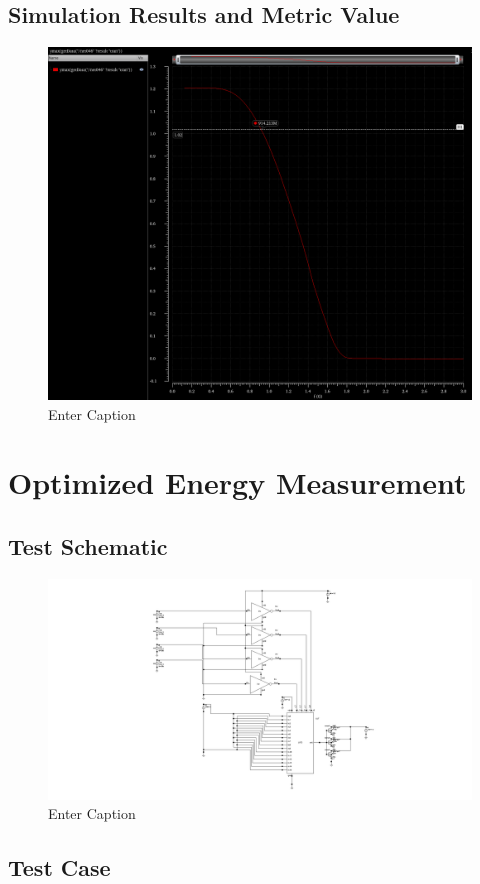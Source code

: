 \documentclass[12pt]{article}
\begin{document}
\newpage

\subsection{Simulation Results and Metric Value}

\begin{figure}[H]
    \centering
    \includegraphics[width=0.5\linewidth]{writeup//figures/max_frequencies_optimized.png}
    \caption{Enter Caption}
\end{figure}



\newpage

\section{Optimized Energy Measurement}
\subsection{Test Schematic}

\begin{figure}[H]
    \centering
    \includegraphics[width=0.5\linewidth]{writeup//figures/updated_energy_opt_testchem.png}
    \caption{Enter Caption}
\end{figure}


\newpage

\subsection{Test Case}
\end{document}
